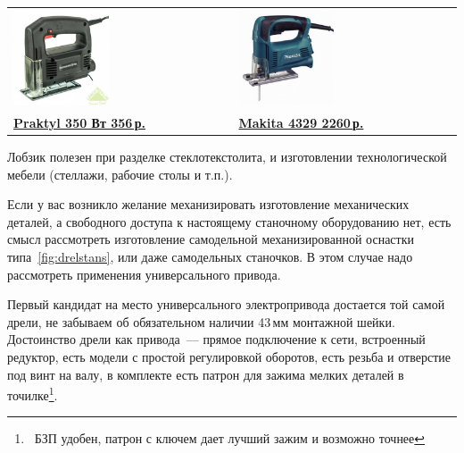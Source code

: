 \noindent
\begin{tabular}{p{} p{}}
\noindent
\includegraphics[width=0.45\textwidth]{tech/tools/LobzPraktyl.jpg}
&
\noindent
\includegraphics[width=0.45\textwidth]{tech/tools/LobzMakita4329.jpg}
\\
\href{http://leroymerlin.ru/catalogue/instrumenty/elektroinstrument/lobziki/13805991/}{\textbf{Praktyl
350 Вт 356\,р.}}
&
\href{http://leroymerlin.ru/catalogue/instrumenty/elektroinstrument/lobziki/12114283/}{\textbf{Makita
4329 2260\,р.}}
\\
\end{tabular}
\bigskip

Лобзик полезен при разделке стеклотекстолита, и изготовлении технологической
мебели (стеллажи, рабочие столы и т.п.).


Если у вас возникло желание механизировать изготовление механических деталей, а
свободного доступа к настоящему станочному оборудованию нет, есть смысл
рассмотреть изготовление самодельной механизированной оснастки
типа\ \ref{fig:drelstans}, или даже самодельных станочков. В этом случае надо
рассмотреть применения универсального привода.

Первый кандидат на место универсального электропривода достается той самой
дрели, не забываем об обязательном наличии 43\,мм монтажной шейки.
Достоинство дрели как привода\ --- прямое подключение к сети, встроенный
редуктор, есть модели с простой регулировкой оборотов, есть резьба и отверстие
под винт на валу, в комплекте есть патрон для зажима мелких деталей в
точилке\footnote{\ БЗП удобен, патрон с ключем дает лучший зажим и возможно
точнее}.

